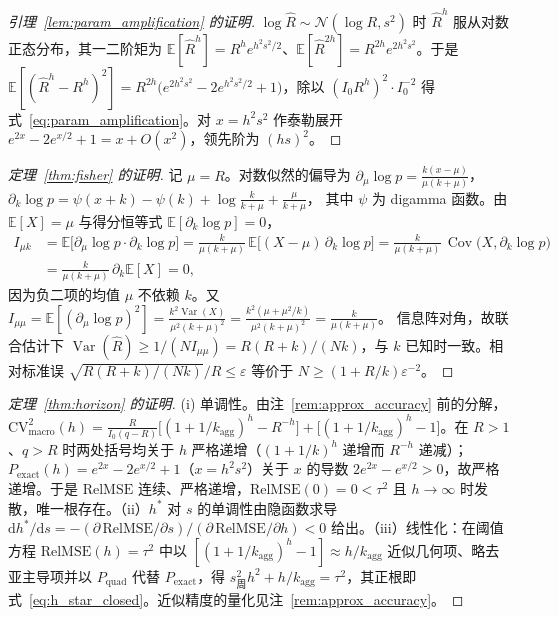 \documentclass[10pt,UTF8,a4paper,zihao=-4]{ctexart}
\theoremstyle{plain}
\theoremstyle{remark}
\begin{document}
\begin{proof}[引理~\ref{lem:param_amplification} 的证明]
$\log\hat R \sim \mathcal{N}(\log R, s^2)$ 时 $\hat R^h$ 服从对数正态分布，其一二阶矩为 $\mathbb{E}[\hat R^h] = R^h e^{h^2 s^2/2}$、$\mathbb{E}[\hat R^{2h}] = R^{2h} e^{2h^2 s^2}$。于是
$\mathbb{E}[(\hat R^h - R^h)^2] = R^{2h}\bigl(e^{2h^2s^2} - 2e^{h^2s^2/2} + 1\bigr)$，除以 $(I_0 R^h)^2 \cdot I_0^{-2}$ 得式~\eqref{eq:param_amplification}。对 $x = h^2 s^2$ 作泰勒展开 $e^{2x} - 2e^{x/2} + 1 = x + O(x^2)$，领先阶为 $(hs)^2$。
\end{proof}

\begin{proof}[定理~\ref{thm:fisher} 的证明]
记 $\mu = R$。对数似然的偏导为
$\partial_\mu \log p = \frac{k(x-\mu)}{\mu(k+\mu)}$，
$\partial_k \log p = \psi(x+k) - \psi(k) + \log\frac{k}{k+\mu} + \frac{\mu}{k+\mu}$，
其中 $\psi$ 为 digamma 函数。由 $\mathbb{E}[X] = \mu$ 与得分恒等式 $\mathbb{E}[\partial_k\log p] = 0$，
\begin{align*}
I_{\mu k} &= \mathbb{E}\bigl[\partial_\mu \log p \cdot \partial_k \log p\bigr]
= \frac{k}{\mu(k+\mu)}\,\mathbb{E}\bigl[(X-\mu)\,\partial_k \log p\bigr]
= \frac{k}{\mu(k+\mu)}\,\operatorname{Cov}\bigl(X, \partial_k \log p\bigr)\\
&= \frac{k}{\mu(k+\mu)}\,\partial_k \mathbb{E}[X] = 0,
\end{align*}
因为负二项的均值 $\mu$ 不依赖 $k$。又
$I_{\mu\mu} = \mathbb{E}[(\partial_\mu\log p)^2] = \frac{k^2\operatorname{Var}(X)}{\mu^2(k+\mu)^2} = \frac{k^2(\mu + \mu^2/k)}{\mu^2(k+\mu)^2} = \frac{k}{\mu(k+\mu)}$。
信息阵对角，故联合估计下 $\operatorname{Var}(\hat R) \ge 1/(N I_{\mu\mu}) = R(R+k)/(Nk)$，与 $k$ 已知时一致。相对标准误 $\sqrt{R(R+k)/(Nk)}/R \le \varepsilon$ 等价于 $N \ge (1 + R/k)\varepsilon^{-2}$。\end{proof}

\begin{proof}[定理~\ref{thm:horizon} 的证明]
(i) 单调性。由注~\ref{rem:approx_accuracy} 前的分解，$\text{CV}^2_{\text{macro}}(h) = \frac{R}{I_0(q-R)}\bigl[(1+1/k_{\text{agg}})^h - R^{-h}\bigr] + \bigl[(1+1/k_{\text{agg}})^h - 1\bigr]$。在 $R>1$、$q>R$ 时两处括号均关于 $h$ 严格递增（$(1+1/k)^h$ 递增而 $R^{-h}$ 递减）；$P_{\text{exact}}(h) = e^{2x}-2e^{x/2}+1$（$x = h^2 s^2$）关于 $x$ 的导数 $2e^{2x} - e^{x/2} > 0$，故严格递增。于是 $\text{RelMSE}$ 连续、严格递增，$\text{RelMSE}(0)=0<\tau^2$ 且 $h\to\infty$ 时发散，唯一根存在。（ii）$h^*$ 对 $s$ 的单调性由隐函数求导 $\mathrm{d}h^*/\mathrm{d}s = -(\partial\,\text{RelMSE}/\partial s)/(\partial\,\text{RelMSE}/\partial h) < 0$ 给出。（iii）线性化：在阈值方程 $\text{RelMSE}(h)=\tau^2$ 中以 $[(1+1/k_{\text{agg}})^h-1] \approx h/k_{\text{agg}}$ 近似几何项、略去亚主导项并以 $P_{\text{quad}}$ 代替 $P_{\text{exact}}$，得 $s_{\text{周}}^2 h^2 + h/k_{\text{agg}} = \tau^2$，其正根即式~\eqref{eq:h_star_closed}。近似精度的量化见注~\ref{rem:approx_accuracy}。
\end{proof}
\end{document}

